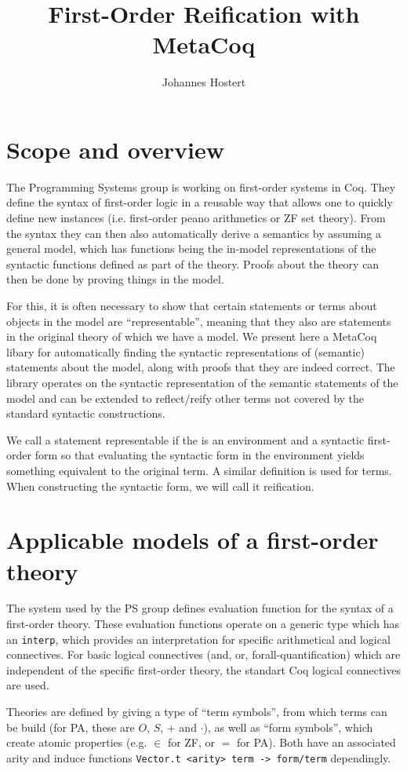 \documentclass[11pt,a4paper]{article}
\author{Johannes Hostert}
\title{First-Order Reification with MetaCoq}
\begin{document}
	\maketitle
	\tableofcontents
	\newpage
\section{Scope and overview}
The Programming Systems group is working on first-order systems in Coq. They define the syntax of first-order logic in a reusable way that allows one to quickly define new instances (i.e. first-order peano arithmetics or ZF set theory). From the syntax they can then also automatically derive a semantics by assuming a general model, which has functions being the in-model representations of the syntactic functions defined as part of the theory. Proofs about the theory can then be done by proving things in the model.

For this, it is often necessary to show that certain statements or terms about objects in the model are \enquote{representable}, meaning that they also are statements in the original theory of which we have a model. We present here a MetaCoq libary for automatically finding the syntactic representations of (semantic) statements about the model,  along with proofs that they are indeed correct. The library operates on the syntactic representation of the semantic statements of the model and can be extended to reflect/reify other terms not covered by the standard syntactic constructions.

We call a statement representable if the is an environment and a syntactic first-order form so that evaluating the syntactic form in the environment yields something equivalent to the original term. A similar definition is used for terms. When constructing the syntactic form, we will call it reification.
\section{Applicable models of a first-order theory}
The system used by the PS group defines evaluation function for the syntax of a first-order theory. These evaluation functions operate on a generic type which has an \lstinline|interp|, which provides an interpretation for specific arithmetical and logical connectives. For basic logical connectives (and, or, forall-quantification) which are independent of the specific first-order theory, the standart Coq logical connectives are used.

Theories are defined by giving a type of \enquote{term symbols}, from which terms can be build (for PA, these are $O$, $S$, $+$ and $\cdot$), as well as \enquote{form symbols}, which create atomic properties (e.g. $\in$ for ZF, or $=$ for PA). Both have an associated arity and induce functions \lstinline|Vector.t <arity> term -> form/term| dependingly.
\end{document}
